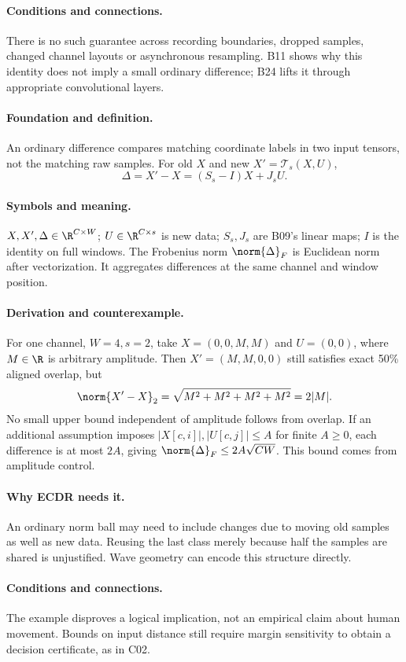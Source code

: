 \paragraph{Conditions and connections.}
There is no such guarantee across recording boundaries, dropped samples,
changed channel layouts or asynchronous resampling. B11 shows why this
identity does not imply a small ordinary difference; B24 lifts it through
appropriate convolutional layers.

\paragraph{Foundation and definition.}
An ordinary difference compares matching coordinate labels in two input
tensors, not the matching raw samples. For old $X$ and new
$X'=\mathcal T_s(X,U)$,
\[
 \Delta=X'-X=(S_s-I)X+J_sU.
\]
\paragraph{Symbols and meaning.}
$X,X',\Delta\in\R^{C\times W}$; $U\in\R^{C\times s}$ is new data;
$S_s,J_s$ are B09's linear maps; $I$ is the identity on full windows.
The Frobenius norm $\norm{\Delta}_F$ is Euclidean norm after vectorization.
It aggregates differences at the same channel and window position.
\paragraph{Derivation and counterexample.}
For one channel, $W=4,s=2$, take $X=(0,0,M,M)$ and $U=(0,0)$, where
$M\in\R$ is arbitrary amplitude. Then $X'=(M,M,0,0)$ still satisfies exact
50\% aligned overlap, but
\[
 \norm{X'-X}_2=\sqrt{M^2+M^2+M^2+M^2}=2|M|.
\]
No small upper bound independent of amplitude follows from overlap. If an
additional assumption imposes $|X[c,i]|,|U[c,j]|\le A$ for finite $A\ge0$,
each difference is at most $2A$, giving
$\norm{\Delta}_F\le2A\sqrt{CW}$. This bound comes from amplitude control.
\paragraph{Why ECDR needs it.}
An ordinary norm ball may need to include changes due to moving old samples
as well as new data. Reusing the last class merely because half the samples
are shared is unjustified. Wave geometry can encode this structure directly.
\paragraph{Conditions and connections.}
The example disproves a logical implication, not an empirical claim about
human movement. Bounds on input distance still require margin sensitivity
to obtain a decision certificate, as in C02.

